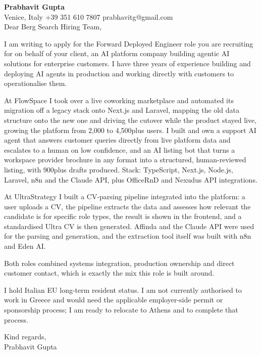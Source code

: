 \documentclass[a4paper,10.5pt]{article}
\begin{document}
\textbf{Prabhavit Gupta}\\
Venice, Italy \textbar{} +39 351 610 7807 \textbar{} prabhavitg@gmail.com\\[10pt]
Dear Berg Search Hiring Team,

I am writing to apply for the Forward Deployed Engineer role you are recruiting for on behalf of your client, an AI platform company building agentic AI solutions for enterprise customers. I have three years of experience building and deploying AI agents in production and working directly with customers to operationalise them.

At FlowSpace I took over a live coworking marketplace and automated its migration off a legacy stack onto Next.js and Laravel, mapping the old data structure onto the new one and driving the cutover while the product stayed live, growing the platform from 2,000 to 4,500plus users. I built and own a support AI agent that answers customer queries directly from live platform data and escalates to a human on low confidence, and an AI listing bot that turns a workspace provider brochure in any format into a structured, human-reviewed listing, with 900plus drafts produced. Stack: TypeScript, Next.js, Node.js, Laravel, n8n and the Claude API, plus OfficeRnD and Nexudus API integrations.

At UltraStrategy I built a CV-parsing pipeline integrated into the platform: a user uploads a CV, the pipeline extracts the data and assesses how relevant the candidate is for specific role types, the result is shown in the frontend, and a standardised Ultra CV is then generated. Affinda and the Claude API were used for the parsing and generation, and the extraction tool itself was built with n8n and Eden AI.

Both roles combined systems integration, production ownership and direct customer contact, which is exactly the mix this role is built around.

I hold Italian EU long-term resident status. I am not currently authorised to work in Greece and would need the applicable employer-side permit or sponsorship process; I am ready to relocate to Athens and to complete that process.

Kind regards,\\
Prabhavit Gupta
\end{document}
